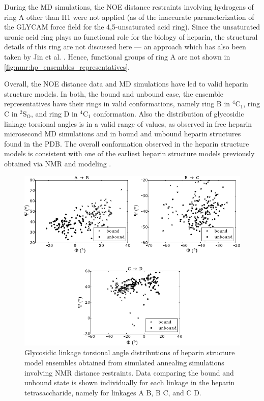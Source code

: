 During the MD simulations, the NOE distance restraints involving hydrogens of
ring A other than H1 were not applied (as of the inaccurate parameterization of
the GLYCAM force field for the 4,5-unsaturated acid ring). Since the unsaturated
uronic acid ring plays no functional role for the biology of heparin, the
structural details of this ring are not discussed here --- an approach which has
also been taken by Jin et al. \cite{jin_heparin_2009}. Hence, functional groups
of ring A are not shown in \cref{fig:nmr:hp_ensembles_representatives}.

Overall, the NOE distance data and MD simulations have led to valid heparin
structure models. In both, the bound and unbound case, the ensemble
representatives have their rings in valid conformations, namely ring B in
${}^4$C${}_1$, ring C in ${}^2$S${}_\mathrm{O}$, and ring D in ${}^4$C${}_1$
conformation. Also the distribution of glycosidic linkage torsional angles is in
a valid range of values, as observed in free heparin microsecond MD simulations
and in bound and unbound heparin structures found in the PDB. The overall
conformation observed in the heparin structure models is consistent with one of
the earliest heparin structure models previously obtained via NMR and modeling
\cite{foster_mulloy_1993}.

\begin{figure}
\begin{adjustwidth}{-1cm}{-1cm}
\centering
\includegraphics[width=1.1\textwidth]{gfx/nmr/glycolinkage_dihedrals_bound_vs_free_3panels_03.pdf}
\caption[]{
Glycosidic linkage torsional angle distributions of heparin structure model
ensembles obtained from simulated annealing simulations involving NMR distance
restraints. Data comparing the bound and unbound state is shown individually for
each linkage in the heparin tetrasaccharide, namely for linkages A
\rightarrow B, B \rightarrow C, and C \rightarrow D.
}
\label{fig:nmr:hp_glyco_dihedral_distributions}
\end{adjustwidth}
\end{figure}

